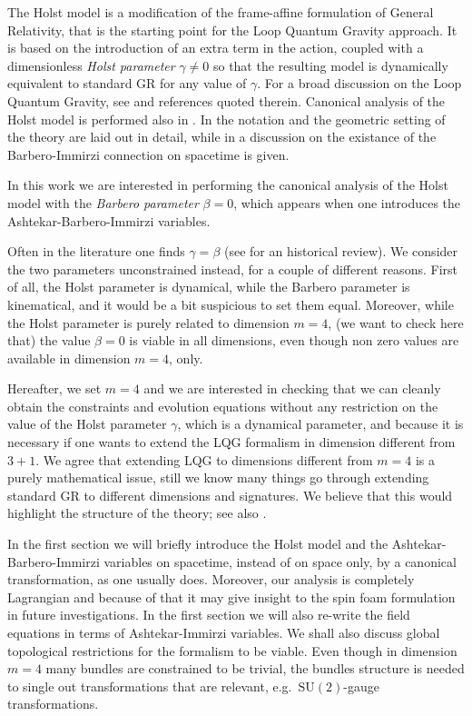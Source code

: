 \documentclass[a4paper, 11pt]{article}
\def\be{\beta}
\def\ga{\gamma}
\def\SU(#1){\mathrm{SU}(#1)}
\numberwithin{equation}{section}
\begin{document}
The Holst model is a modification of the frame-affine formulation of General Relativity, that is the starting point for the Loop Quantum Gravity approach. 
It is based on the introduction of an extra term in the action, coupled with a dimensionless {\it Holst parameter\/ } $\ga\not=0$ so that the resulting model is dynamically equivalent to standard GR for any value of $\ga$. For a broad discussion on the Loop Quantum Gravity, see \cite{rovelliCovariantLoopQuantum2015, rovelli2004quantum,Ashtekar_2021, Thiemann:2002nj,Thiemann:2007pyv,AbhayAshtekar2004, Thiemann2003} and references quoted therein. Canonical analysis of the Holst model is performed also in \cite{geillerNoteHolstAction2013, montesinos}.
In \cite{fatibeneLectureNotes2, fatibeneLectureNote3} the notation and the geometric setting of the theory are laid out in detail, while in \cite{Fatibene_2007a, Fatibene_2007, Fatibene:2012px, orizzonteBarberoImmirziConnectionsHow2021} a discussion on the existance of the Barbero-Immirzi connection on spacetime is given.

In this work we are interested in performing the canonical analysis of the Holst model with  the {\it Barbero parameter} $\be = 0$, which appears 
when one introduces the Ashtekar-Barbero-Immirzi variables. 

Often in the literature one finds $\ga=\be$ (see \cite{physics4040072} for an historical review). We consider the two parameters unconstrained instead, for a couple of different reasons.
First of all, the Holst parameter is dynamical, while the Barbero parameter is kinematical, and it would be a bit suspicious to set them equal.
Moreover, while the Holst parameter is purely related to dimension $m=4$, (we want to check here that) the value $\be=0$ is viable in all dimensions, 
even though non zero values are available in dimension $m=4$, only.

Hereafter, we set $m=4$ and we are interested in checking that we can cleanly obtain the constraints and evolution equations without any restriction on the value of the Holst parameter $\ga$, which is a dynamical parameter, and because it is necessary if one wants to extend the LQG formalism in dimension different from $3+1$.
We agree that extending LQG to dimensions different from $m=4$ is a purely mathematical issue, still we know many things go through extending standard GR to different dimensions and signatures. We believe that this would highlight the structure of the theory; see also \cite{Fatibene:2012px}.

In the first section we will briefly introduce the Holst model and the Ashtekar-Barbero-Immirzi variables on spacetime, instead of on space only, by a canonical transformation, as one usually does. Moreover, our analysis is completely Lagrangian and because of that it may give insight to the spin foam formulation in future investigations.
In the first section we will also re-write the field equations in terms of Ashtekar-Immirzi variables. 
We shall also discuss global topological restrictions for the formalism to be viable. Even though in dimension $m=4$ many bundles are constrained to be trivial, the bundles structure is needed to single out transformations that are relevant, e.g.~$\SU(2)$-gauge transformations.
\end{document}
